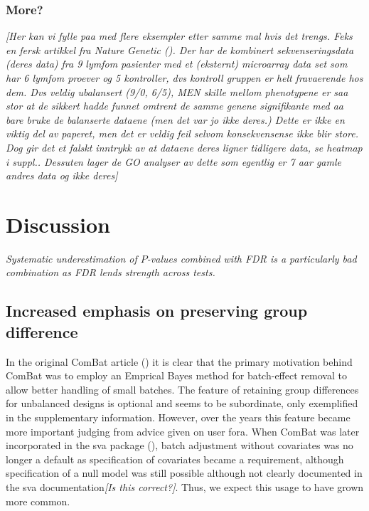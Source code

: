 \documentclass{bio}
\newcommand\COMMENT[2]{\textcolor{COMMENTcol}{#1}\NOTE{#2}}
\newcommand\NB[1]{\textcolor{NBcol}{\textit{#1}}}
\newcommand\NOTE[1]{\NB{[#1]}}
\begin{document}


\subsubsection{More?}

\NOTE{Her kan vi fylle paa med flere eksempler etter samme mal hvis det trengs. Feks en fersk artikkel fra Nature Genetic (\citealp{Yoo2014}). Der har de kombinert sekvenseringsdata  (deres data) fra 9 lymfom pasienter med et (eksternt) microarray data set som har 6 lymfom proever og 5 kontroller, dvs kontroll gruppen er helt fravaerende hos dem. Dvs veldig ubalansert (9/0, 6/5), MEN skille mellom phenotypene er saa stor at de sikkert hadde funnet omtrent de samme genene signifikante med aa bare bruke de balanserte dataene (men det var jo ikke deres.) Dette er ikke en viktig del av paperet, men det er veldig feil selvom konsekvensense ikke blir store. Dog gir det et falskt inntrykk av at dataene deres ligner tidligere data, se heatmap i suppl.. Dessuten lager de GO analyser av dette som egentlig er 7 aar gamle andres data og ikke deres}


\section{Discussion}

\NB{Systematic underestimation of $P$-values combined with FDR is a particularly bad combination as FDR lends strength across tests.}

\subsection{Increased emphasis on preserving group difference}

In the original ComBat article (\citealp{Johnson2007}) it is clear that the primary motivation behind ComBat was to employ an Emprical Bayes method for batch-effect removal to allow better handling of small batches. The feature of retaining group differences for unbalanced designs is optional and seems to be subordinate, only exemplified in the supplementary information. However, over the years this feature became more important judging from advice given on user fora.  
When ComBat was later incorporated in the sva package (\citealp{Leek2012}), \COMMENT{batch adjustment without covariates was no longer a default as specification of covariates became a requirement, although specification of a null model was still possible although not clearly documented in the sva documentation}{Is this correct?}. Thus, we expect this usage to have grown more common.
\end{document}
